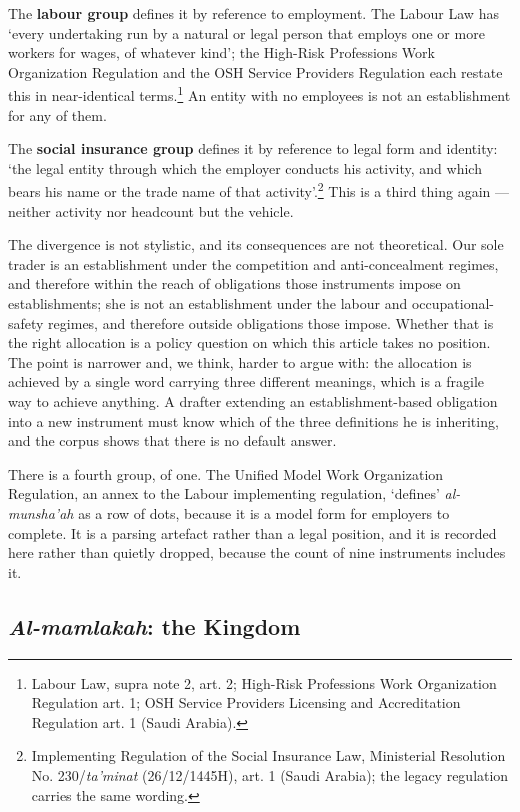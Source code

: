 \documentclass[11pt]{article}
\begin{document}
The \textbf{labour group} defines it by reference to employment. The Labour
Law has `every undertaking run by a natural or legal person that employs one
or more workers for wages, of whatever kind'; the High-Risk Professions Work
Organization Regulation and the OSH Service Providers Regulation each restate
this in near-identical terms.\footnote{Labour Law, supra note 2, art. 2; High-Risk Professions Work Organization Regulation art. 1; OSH Service Providers Licensing and Accreditation Regulation art. 1 (Saudi Arabia).} An entity with no employees
is not an establishment for any of them.

The \textbf{social insurance group} defines it by reference to legal form and
identity: `the legal entity through which the employer conducts his activity,
and which bears his name or the trade name of that activity'.\footnote{
Implementing Regulation of the Social Insurance Law, Ministerial Resolution No. 230/\emph{ta'minat} (26/12/1445H), art. 1 (Saudi Arabia); the legacy regulation carries the
same wording.} This is a third thing again --- neither activity nor headcount
but the vehicle.

The divergence is not stylistic, and its consequences are not theoretical.
Our sole trader is an establishment under the competition and anti-concealment
regimes, and therefore within the reach of obligations those instruments
impose on establishments; she is not an establishment under the labour and
occupational-safety regimes, and therefore outside obligations those impose.
Whether that is the right allocation is a policy question on which this
article takes no position. The point is narrower and, we think, harder to
argue with: the allocation is achieved by a single word carrying three
different meanings, which is a fragile way to achieve anything. A drafter
extending an establishment-based obligation into a new instrument must know
which of the three definitions he is inheriting, and the corpus shows that
there is no default answer.

There is a fourth group, of one. The Unified Model Work Organization
Regulation, an annex to the Labour implementing regulation, `defines'
\emph{al-munsha'ah} as a row of dots, because it is a model form for
employers to complete. It is a parsing artefact rather than a legal position,
and it is recorded here rather than quietly dropped, because the count of
nine instruments includes it.

\subsection{\emph{Al-mamlakah}: the Kingdom}
\end{document}
